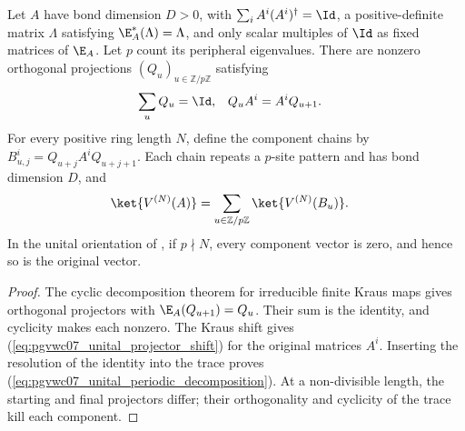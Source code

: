 \begin{lemma}
    \label{thm:pgvwc07_periodic_state_vector_decomposition}
    \leanok
    Let $A$ have bond dimension $D>0$, with $\sum_iA^i(A^i)^\dagger=\Id$,
    a positive-definite matrix $\Lambda$ satisfying $\E_A^*(\Lambda)=\Lambda$,
    and only scalar multiples of $\Id$ as fixed matrices of $\E_A$.
    Let $p$ count its peripheral eigenvalues. There are nonzero orthogonal projections
    $(Q_u)_{u\in\mathbb Z/p\mathbb Z}$ satisfying
    \begin{align}
        \sum_uQ_u & =\Id, & Q_uA^i & =A^iQ_{u+1}.
        \label{eq:pgvwc07_unital_projector_shift}
    \end{align}
    For every positive ring length $N$, define the component chains by
    $B_{u,j}^i=Q_{u+j}A^iQ_{u+j+1}$. Each chain repeats a $p$-site pattern
    and has bond dimension $D$, and
    \begin{align}
        \ket{V^{(N)}(A)} & =\sum_{u\in\mathbb Z/p\mathbb Z}
        \ket{V^{(N)}(B_u)}.
        \label{eq:pgvwc07_unital_periodic_decomposition}
    \end{align}
    In the unital orientation of \cite[Theorem~5]{PerezGarcia2007Matrix}, if
    $p\nmid N$, every component vector is zero, and hence so is the original
    vector.
\end{lemma}

\begin{proof}
    \leanok
    The cyclic decomposition theorem for irreducible finite Kraus maps
    \cite[``Cyclic decomposition for irreducible finite Kraus maps]{QICLean2026Blueprint}
    gives orthogonal projectors with
    $\E_A(Q_{u+1})=Q_u$. Their sum is the identity, and cyclicity makes each
    nonzero. The Kraus shift gives
    (\ref{eq:pgvwc07_unital_projector_shift}) for the original matrices
    $A^i$. Inserting the resolution of the identity into the trace proves
    (\ref{eq:pgvwc07_unital_periodic_decomposition}). At a non-divisible
    length, the starting and final projectors differ; their orthogonality
    and cyclicity of the trace kill each component.
\end{proof}

